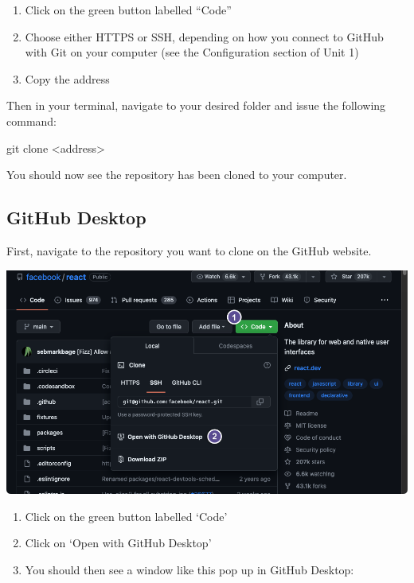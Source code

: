 \documentclass[
  letterpaper,
  DIV=11,
  numbers=noendperiod]{scrartcl}
\newenvironment{Shaded}{\begin{snugshade}}{\end{snugshade}}
\newcommand{\FunctionTok}[1]{\textcolor[rgb]{0.28,0.35,0.67}{#1}}
\newcommand{\NormalTok}[1]{\textcolor[rgb]{0.00,0.23,0.31}{#1}}
\newcommand{\OperatorTok}[1]{\textcolor[rgb]{0.37,0.37,0.37}{#1}}
\begin{document}
\begin{enumerate}
\def\labelenumi{\arabic{enumi}.}
\item
  Click on the green button labelled ``Code''
\item
  Choose either HTTPS or SSH, depending on how you connect to GitHub
  with Git on your computer (see the Configuration section of Unit 1)
\item
  Copy the address
\end{enumerate}

Then in your terminal, navigate to your desired folder and issue the
following command:

\begin{Shaded}
\begin{Highlighting}[]
\FunctionTok{git}\NormalTok{ clone }\OperatorTok{\textless{}}\NormalTok{address}\OperatorTok{\textgreater{}}
\end{Highlighting}
\end{Shaded}

You should now see the repository has been cloned to your computer.

\subsection{GitHub Desktop}

First, navigate to the repository you want to clone on the GitHub
website.

\includegraphics{images/image24.png}

\begin{enumerate}
\def\labelenumi{\arabic{enumi}.}
\item
  Click on the green button labelled `Code'
\item
  Click on `Open with GitHub Desktop'
\item
  You should then see a window like this pop up in GitHub Desktop:
\end{enumerate}
\end{document}
